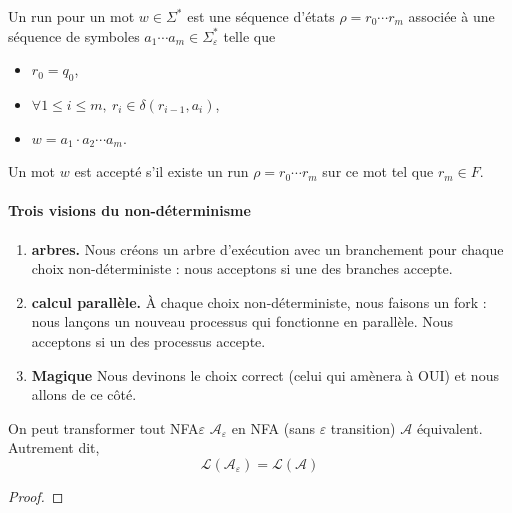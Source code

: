\begin{definition}
Un run pour un mot $w \in \Sigma^*$ est une séquence d'états
$\rho = r_0 \cdots r_m$ associée à une séquence de symboles
$a_1 \cdots a_m \in \Sigma_\varepsilon^*$ telle que
\begin{itemize}
    \item $r_0 = q_0$,
    \item $\forall 1 \leq i \leq m,\ r_i \in \delta(r_{i-1}, a_i)$,
    \item $w = a_1 \cdot a_2 \cdots a_m$.
\end{itemize}
\end{definition}

\begin{definition}
Un mot $w$ est accepté s'il existe un run $\rho = r_0 \cdots r_m$ sur ce mot
tel que $r_m \in F$.
\end{definition}

\paragraph{Trois visions du non-déterminisme}

\begin{enumerate}
    \item \textbf{arbres.}
    Nous créons un arbre d'exécution avec un branchement pour chaque choix
    non-déterministe : nous acceptons si une des branches accepte.

    \item \textbf{calcul parallèle.}
    À chaque choix non-déterministe, nous faisons un \og fork \fg{} : nous lançons
    un nouveau processus qui fonctionne en parallèle. Nous acceptons si un des
    processus accepte.

    \item \textbf{Magique}
    Nous \og devinons \fg{} le choix correct (celui qui amènera à OUI) et nous
    allons de ce côté.
\end{enumerate}

\begin{proposition}
    On peut transformer tout NFA$\varepsilon$ $\mathcal{A}_\varepsilon$ en NFA (sans $\varepsilon$ transition) $\mathcal{A}$ équivalent. Autrement dit,
    $$\mathcal{L}(\mathcal{A}_\varepsilon)=\mathcal{L}(\mathcal{A})$$
\end{proposition}

\begin{proof}
    
\end{proof}


